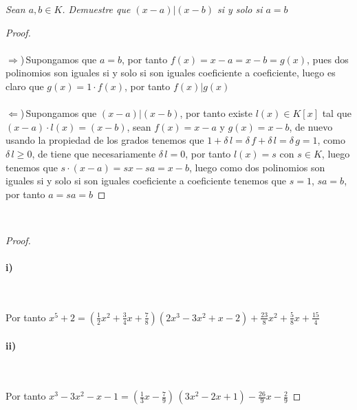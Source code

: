 \documentclass[11pt,letterpaper]{article}
\begin{document}
\begin{tcolorbox}[
	title = \textcolor{black}{\textcolor{white}{Problema 5}},]
\textit{Sean $a,b\in K $. Demuestre que $(x-a)|(x-b) $ si y solo si $a=b$
}
\end{tcolorbox}
\begin{proof}\,\\
    \,\\
$\Rightarrow$)\,Supongamos que $a=b$, por tanto $f(x)=x-a=x-b=g(x)$, pues dos polinomios son iguales si y solo si son iguales coeficiente a coeficiente, luego
es claro que $g(x)=1\cdot f(x)$, por tanto $f(x)|g(x)$\,\\
\,\\
$\Leftarrow$)\,Supongamos que $(x-a)|(x-b)$, por tanto existe $l(x)\in K[x]$ tal que $(x-a)\cdot l(x)=(x-b)$, sean $f(x)=x-a$ y $g(x)=x-b$, de nuevo
usando la propiedad de los grados tenemos que $1+\delta\,l=\delta\,f+\delta\,l=\delta\,g=1$, como $\delta\,l\geq 0$, de tiene que necesariamente $\delta\,l=0$, por tanto
$l(x)=s$ con $s\in K$, luego tenemos que $s\cdot(x-a)=sx-sa=x-b$, luego como dos polinomios son iguales si y solo si son iguales coeficiente a coeficiente tenemos que
$s=1$, $sa=b$, por tanto $a=sa=b$ 
\end{proof}\,\\
\newpage
{}
\begin{proof}\,\\
    \,\\
    \textbf{i)}\,\\
    
        \begin{center}
        \end{center}\,\\
        \,\\
        Por tanto $x^5+2=\left(\frac{1}{2}x^2+\frac{3}{4}x+\frac{7}{8}\right)(2x^3-3x^2+x-2)+\frac{23}{8}x^2+\frac{5}{8}x+\frac{15}{4}$\,\\
        \,\\
        \textbf{ii)}\,\\
         \begin{center}
        \end{center}\,\\
        \,\\
        Por tanto $x^3-3x^2-x-1=\left(\frac{1}{3}x-\frac{7}{9}\right)\,(3x^2-2x+1)-\frac{26}{9}x-\frac{2}{9}$
\end{proof}\,\\
\end{document}
